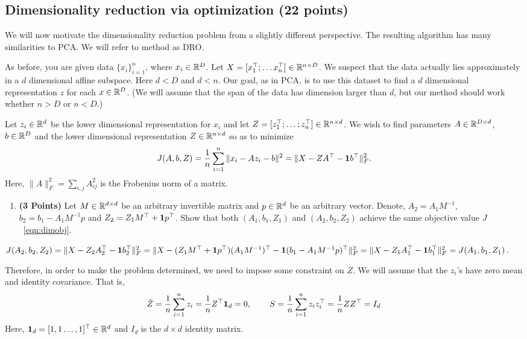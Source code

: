 \subsection{Dimensionality reduction via optimization (22 points)}

We will now motivate the dimensionality reduction problem from a slightly different
perspective. The resulting algorithm has many similarities to PCA.
We will refer to method as DRO.

As before, you are given data $\{x_i\}_{i=1}^n$, where $x_i \in \mathbb{R}^D$. Let $X=[x_1^\top; \dots
x_n^\top] \in \mathbb{R}^{n\times D}$. We suspect that the data
actually lies approximately in  a $d$ dimensional affine subspace.
Here $d<D$ and $d<n$.
Our goal, as in PCA, is to use this dataset to find a $d$ dimensional representation $z$ for each $x\in\mathbb{R}^D$.
(We will assume that the span of the data has dimension larger than
$d$, but our method should work whether $n>D$ or $n<D$.)


Let $z_i\in \mathbb{R}^d$ be the lower dimensional representation for $x_i$ and
let $Z = [z_1^\top; \dots; z_n^\top] \in \mathbb{R}^{n\times d}$.
We wish to find parameters $A \in \mathbb{R}^{D\times d}$, $b\in\mathbb{R}^D$ and the lower
dimensional representation $Z\in \mathbb{R}^{n\times d}$ so as to minimize 
\begin{equation}
J(A,b,Z) = \frac{1}{n} \sum_{i=1}^n \|x_i - Az_i - b\|^2 = \| X - ZA^\top - {\bf 1} b^\top\|_F^2.
\label{eqn:dimobj}
\end{equation}
Here, $\|A\|^2_F = \sum_{i,j} A_{ij}^2$ is the Frobenius norm of a matrix.


\begin{enumerate}
\item \textbf{(3 Points)}
Let $M\in\mathbb{R}^{d\times d}$ be an arbitrary invertible matrix and $p\in\mathbb{R}^{d}$ be an arbitrary vector.
Denote, $A_2 = A_1M^{-1}$, $b_2 = b_1- A_1M^{-1}p$ and $Z_2 = Z_1 M^\top +
{\bf 1} p^\top$.
Show that both
$(A_1, b_1, Z_1)$ and $(A_2, b_2, Z_2)$ achieve the same objective value $J$~\eqref{eqn:dimobj}.
\end{enumerate}

\begin{soln}
  $J(A_2, b_2, Z_2) = \| X - Z_2A_2^\top - {\bf 1} b_2^\top\|_F^2 = \| X - (Z_1 M^\top +
  {\bf 1} p^\top)(A_1M^{-1})^\top - {\bf 1} (b_1- A_1M^{-1}p)^\top\|_F^2 = \| X - Z_1A_1^\top - {\bf 1} b_1^\top\|_F^2 = J(A_1, b_1, Z_1)$.
\end{soln}

Therefore, in order to make the problem determined, we need to impose some
constraint on $Z$. We will assume that the $z_i$'s have zero mean and identity covariance.
That is,
\begin{align*}
\bar{Z} = \frac{1}{n} \sum_{i=1}^n z_i =\frac{1}{n} Z^\top {\bf 1}_d = 0, \hspace{0.3in} 
S = \frac{1}{n} \sum_{i=1}^n z_i z_i^\top 
= \frac{1}{n} Z Z^\top
= I_d
\end{align*}
Here, ${\bf 1}_d = [1, 1 \dots, 1]^\top \in\mathbb{R}^d$ and $I_d$  is the $d\times d$ identity matrix.

